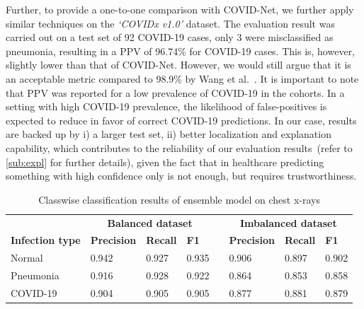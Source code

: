 \documentclass[conference]{IEEEtran}
\begin{document}
Further, to provide a one-to-one comparison with COVID-Net, we further apply similar techniques on the \emph{`COVIDx v1.0'} dataset. The evaluation result was carried out on a test set of 92 COVID-19 cases, only 3 were misclassified as pneumonia, resulting in a PPV of 96.74\% for COVID-19 cases. This is, however, slightly lower than that of COVID-Net. However, we would still argue that it is an acceptable metric compared to 98.9\% by Wang et al.~\cite{wang2020covid}. It is important to note that PPV was reported for a low prevalence of COVID-19 in the cohorts. In a setting with high COVID-19 prevalence, the likelihood of false-positives is expected to reduce in favor of correct COVID-19 predictions. In our case, results are backed up by i) a larger test set, ii) better localization and explanation capability, which contributes to the reliability of our evaluation results~(refer to \cref{sub:expl} for further details), given the fact that in healthcare predicting something with high confidence only is not enough, but requires trustworthiness. 

\begin{table}
    \centering
	\caption{Classwise classification results of ensemble model on chest x-rays}
	\label{Table:class_specific_result}
	\begin{tabular}{p{3.2cm}p{1.7cm}p{1.1cm}p{1.3cm}p{0.1cm}p{1.7cm}p{1.2cm}p{1.0cm}}
		 & \multicolumn{3}{c}{\textbf{Balanced dataset}} && \multicolumn{3}{c}{\textbf{Imbalanced dataset}} \\	
		\cmidrule{2-4}\cmidrule{6-8}
		\textbf{Infection type} & \textbf{Precision} & \textbf{Recall}& \textbf{F1}&& \textbf{Precision} & \textbf{Recall}& \textbf{F1}\\	
		\hline
		Normal & 0.942 & 0.927 & 0.935 && 0.906 & 0.897 & 0.902\\
		Pneumonia & 0.916 & 0.928 & 0.922 && 0.864 & 0.853 & 0.858\\
		COVID-19 & 0.904 & 0.905 & 0.905 && 0.877 & 0.881 & 0.879\\
		\hline
	\end{tabular}
\end{table}
\end{document}
